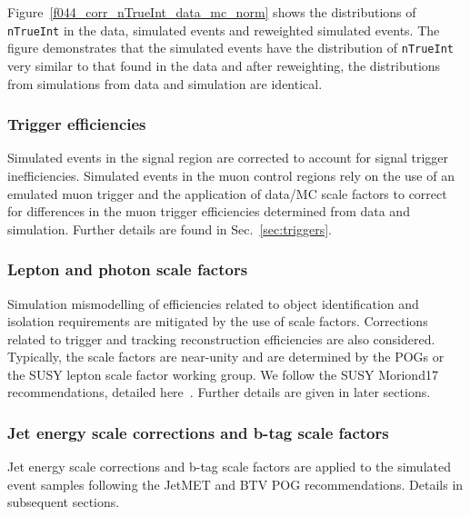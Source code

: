 Figure~\ref{f044_corr_nTrueInt_data_mc_norm} shows the distributions
of \verb!nTrueInt! in the data, simulated events and reweighted
simulated events. The figure demonstrates that the simulated events
have the distribution of \verb!nTrueInt! very similar to that found in
the data and after reweighting, the distributions from simulations
from data and simulation are identical.

\subsubsection{Trigger efficiencies}
\label{sec:trigger-sf}

Simulated events in the signal region are corrected to account for
signal trigger inefficiencies. Simulated events in the muon control
regions rely on the use of an emulated muon trigger and the
application of data/MC scale factors to correct for differences in the
muon trigger efficiencies determined from data and simulation. Further
details are found in Sec.~\ref{sec:triggers}.

\subsubsection{Lepton and photon scale factors}

Simulation mismodelling of efficiencies related to object
identification and isolation requirements are mitigated by the use of
scale factors. Corrections related to trigger and tracking
reconstruction efficiencies are also considered. Typically, the scale
factors are near-unity and are determined by the POGs or the SUSY
lepton scale factor working group. We follow the SUSY Moriond17
recommendations, detailed here~\cite{susymoriond}. Further details are
given in later sections.

\subsubsection{Jet energy scale corrections and b-tag scale factors}
\label{sec:jecs-and-btag-sf}

Jet energy scale corrections and b-tag scale factors are applied to
the simulated event samples following the JetMET and BTV POG
recommendations. Details in subsequent sections. 

